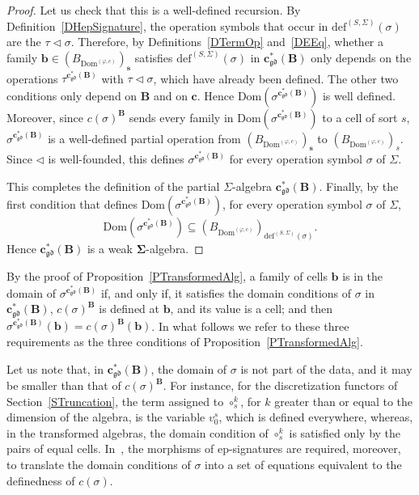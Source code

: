 \documentclass[a4paper, reqno
]{amsart}
\newcommand{\sig}[1]{\mathbf{#1}}             %
\newcommand{\Dom}{\mathrm{Dom}}
\newcommand{\gd}{\mathfrak{gd}}              %
\theoremstyle{plain}
\theoremstyle{definition}
\begin{document}
\begin{proof}
Let us check that this is a well-defined recursion.
By Definition~\ref{DHepSignature}, the operation symbols that occur in $\mathrm{def}^{(S,\Sigma)}(\sigma)$ are the $\tau\lhd\sigma$.
Therefore, by Definitions~\ref{DTermOp} and~\ref{DEEq}, whether a family $\mathbf{b}\in(B_{\Dom^{(\varphi,c)}})_{\mathbf{s}}$ satisfies $\mathrm{def}^{(S,\Sigma)}(\sigma)$ in $\mathbf{c}^{\ast}_{\gd}(\mathbf{B})$ only depends on the operations $\tau^{\mathbf{c}^{\ast}_{\gd}(\mathbf{B})}$ with $\tau\lhd\sigma$, which have already been defined.
The other two conditions only depend on $\mathbf{B}$ and on $\mathbf{c}$.
Hence $\Dom(\sigma^{\mathbf{c}^{\ast}_{\gd}(\mathbf{B})})$ is well defined.
Moreover, since $c(\sigma)^{\mathbf{B}}$ sends every family in $\Dom(\sigma^{\mathbf{c}^{\ast}_{\gd}(\mathbf{B})})$ to a cell of sort $s$, $\sigma^{\mathbf{c}^{\ast}_{\gd}(\mathbf{B})}$ is a well-defined partial operation from $(B_{\Dom^{(\varphi,c)}})_{\mathbf{s}}$ to $(B_{\Dom^{(\varphi,c)}})_{s}$.
Since $\lhd$ is well-founded, this defines $\sigma^{\mathbf{c}^{\ast}_{\gd}(\mathbf{B})}$ for every operation symbol $\sigma$ of $\Sigma$.

This completes the definition of the partial $\Sigma$-algebra $\mathbf{c}^{\ast}_{\gd}(\mathbf{B})$.
Finally, by the first condition that defines $\Dom(\sigma^{\mathbf{c}^{\ast}_{\gd}(\mathbf{B})})$, for every operation symbol $\sigma$ of $\Sigma$,
$$
\Dom\left(\sigma^{\mathbf{c}^{\ast}_{\gd}(\mathbf{B})}\right)\subseteq\left(B_{\Dom^{(\varphi,c)}}\right)_{\mathrm{def}^{(S,\Sigma)}(\sigma)}.
$$
Hence $\mathbf{c}^{\ast}_{\gd}(\mathbf{B})$ is a weak $\sig{\Sigma}$-algebra.
\end{proof}

By the proof of Proposition~\ref{PTransformedAlg}, a family of cells $\mathbf{b}$ is in the domain of $\sigma^{\mathbf{c}^{\ast}_{\gd}(\mathbf{B})}$ if, and only if, it satisfies the domain conditions of $\sigma$ in $\mathbf{c}^{\ast}_{\gd}(\mathbf{B})$, $c(\sigma)^{\mathbf{B}}$ is defined at $\mathbf{b}$, and its value is a cell; and then $\sigma^{\mathbf{c}^{\ast}_{\gd}(\mathbf{B})}(\mathbf{b})=c(\sigma)^{\mathbf{B}}(\mathbf{b})$.
In what follows we refer to these three requirements as the three conditions of Proposition~\ref{PTransformedAlg}.

Let us note that, in $\mathbf{c}^{\ast}_{\gd}(\mathbf{B})$, the domain of $\sigma$ is not part of the data, and it may be smaller than that of $c(\sigma)^{\mathbf{B}}$.
For instance, for the discretization functors of Section~\ref{STruncation}, the term assigned to $\circ^{k}_{s}$, for $k$ greater than or equal to the dimension of the algebra, is the variable $v^{s}_{0}$, which is defined everywhere, whereas, in the transformed algebras, the domain condition of $\circ^{k}_{s}$ is satisfied only by the pairs of equal cells.
In~\cite{Rei87}, the morphisms of ep-signatures are required, moreover, to translate the domain conditions of $\sigma$ into a set of equations equivalent to the definedness of $c(\sigma)$.
\end{document}
